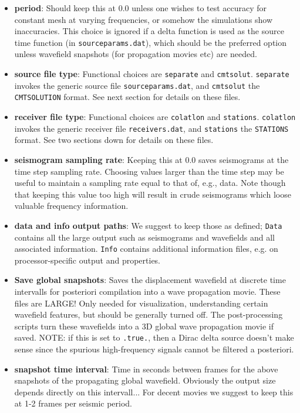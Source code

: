 \documentclass[11pt,letter,fleqn,english,notitlepage]{article}
\begin{document}
\begin{itemize}
\item \textbf{period}: Should keep this at 0.0 unless one wishes to test accuracy for 
constant mesh at varying frequencies, or somehow the simulations show 
inaccuracies. This choice is ignored if a delta function is used as the source 
time function (in {\tt sourceparams.dat}), which should be the preferred option
unless wavefield snapshots (for propagation movies etc) are needed. 
\item \textbf{source file type}: Functional choices are {\tt separate} and {\tt cmtsolut}.
{\tt separate} invokes the generic source file {\tt sourceparams.dat}, and {\tt cmtsolut}
the {\tt CMTSOLUTION} format. See next section for details on these files. 
\item \textbf{receiver file type}: Functional choices are {\tt colatlon} and {\tt stations}.
{\tt colatlon} invokes the generic receiver file {\tt receivers.dat}, and {\tt stations}
the {\tt STATIONS} format. See two sections down for details on these files. 
\item \textbf{seismogram sampling rate}: Keeping this at 0.0 saves seismograms 
at the time step sampling rate. Choosing values larger than the time step may 
be useful to maintain a sampling rate equal to that of, e.g., data. Note though 
that keeping this value too high will result in crude seismograms which loose 
valuable frequency information.

\item \textbf{data and info output paths}: We suggest to keep those as defined; 
{\tt Data} contains all the large output such as seismograms and wavefields and all 
associated information. {\tt Info} contains additional information files, e.g. on 
processor-specific output and properties. 

\item \textbf{Save global snapshots}: Saves the displacement wavefield at discrete time 
intervalls for posteriori compilation into a wave propagation movie. These files are LARGE!
Only needed for visualization, understanding certain wavefield features, but should be 
generally turned off. The post-processing scripts turn these wavefields into a 3D global 
wave propagation movie if saved. NOTE: if this is set to {\tt .true.}, then a Dirac delta 
source doesn't make sense since the spurious high-frequency signals cannot be filtered 
a posteriori. 

\item \textbf{snapshot time interval}: Time in seconds between frames for the above snapshots 
of the propagating global wavefield. Obviously the output size depends directly on this intervall... 
For decent movies we suggest to keep this at 1-2 frames per seismic period. 


\end{itemize}
\end{document}
